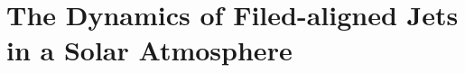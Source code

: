 \documentclass[12pt]{ociamthesis}
\newcommand{\solphys}{{\it Solar Phys.}}
\begin{document}
\baselineskip=18pt

\setcounter{secnumdepth}{3}
\setcounter{tocdepth}{3}

\setcounter{chapter}{1}


\chapter{The Dynamics of Filed-aligned Jets in a Solar Atmosphere}
%
\end{document}

